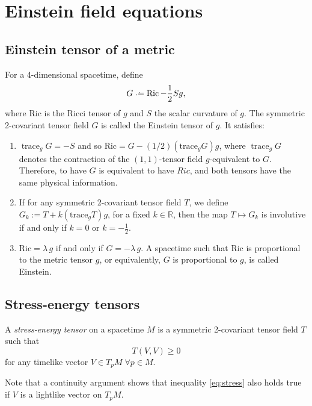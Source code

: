 \chapter{Einstein field equations}

\section{Einstein tensor of a metric}

For a 4-dimensional spacetime, define
\[
	G \defeq \operatorname{Ric}-\frac{1}{2}Sg,
\]
where Ric is the Ricci tensor of $g$ and $S$ the scalar curvature of $g$. The symmetric 2-covariant tensor field $G$ is called the Einstein tensor of $g$. It satisfies:

\begin{enumerate}
	\item $\operatorname{trace}_gG=-S$ and so $\mathrm{Ric}=G-(1/2)(\mathrm{trace}_gG)g$, where $\operatorname{trace}_gG$ denotes the contraction of the $(1,1)$-tensor field $g$-equivalent to $G$. Therefore, to have $G$ is equivalent to have $Ric$, and both tensors have the same physical information.
	\item If for any symmetric 2-covariant tensor field $T$, we define $G_k:=T+k(\mathrm{trace}_gT)g$, for a fixed $k\in \mathbb{R}$, then the map $T \longmapsto G_k$ is involutive if and only if $k=0$ or $k=-\frac{1}{2}$.
	\item $\mathrm{Ric}=\lambda\,g$ if and only if $G=-\lambda\,g$. A spacetime such that Ric is proportional to the metric tensor $g$, or equivalently, $G$ is proportional to $g$, is called Einstein.
\end{enumerate}

\section{Stress-energy tensors}

\begin{definition}
	A \emph{stress-energy tensor} on a spacetime $M$ is a symmetric 2-covariant tensor field $T$ such that
	\begin{equation}
	\label{eq:stress}
		T(V,V) \geq 0
	\end{equation}
	for any timelike vector $V \in T_p M \; \forall p \in M$.
\end{definition}

Note that a continuity argument shows that inequality \ref{eq:stress} also holds true if $V$ is a lightlike vector on $T_p M$.

